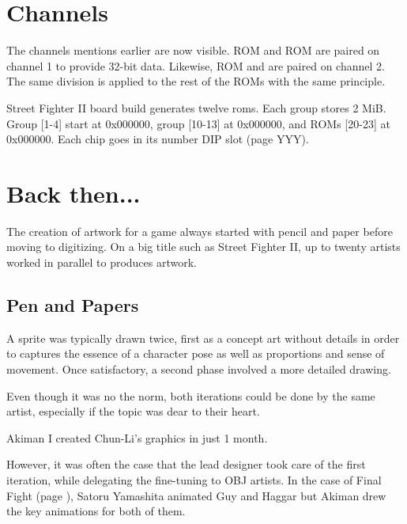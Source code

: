 
\section{Channels}\label{channels}
The channels mentions earlier are now visible. ROM  and ROM  are paired on channel 1 to provide 32-bit data. Likewise, ROM  and  are paired on channel 2. The same division is applied to the rest of the ROMs with the same principle. 


Street Fighter II board build generates twelve roms. Each group stores 2 MiB. Group [1-4] start at 0x000000, group [10-13] at 0x000000, and ROMs [20-23] at 0x000000. Each chip goes in its number DIP slot (page YYY).










\section{Back then...}
The creation of artwork for a game always started with pencil and paper before moving to digitizing. On a big title such as Street Fighter II, up to twenty artists worked in parallel to produces artwork.

\subsection{Pen and Papers}
A sprite was typically drawn twice, first as a concept art without details in order to captures the essence of a character pose as well as proportions and sense of movement. Once satisfactory, a second phase involved a more detailed drawing.

Even though it was no the norm, both iterations could be done by the same artist, especially if the topic was dear to their heart.

\begin{q}{Akiman}
I created Chun-Li’s graphics in just 1 month.
\end{q}

However, it was often the case that the lead designer took care of the first iteration, while delegating the fine-tuning to OBJ artists. In the case of Final Fight (page \pageref{ff_design}), Satoru Yamashita animated Guy and Haggar but Akiman drew the key animations for both of them.



